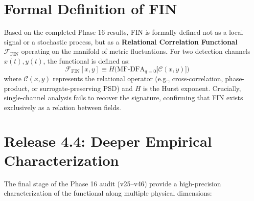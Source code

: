 \documentclass[11pt,a4paper]{book}
\theoremstyle{remark}
\begin{document}
\section{Formal Definition of FIN}
Based on the completed Phase 16 results, FIN is formally defined not as a local signal or a stochastic process, but as a \textbf{Relational Correlation Functional} $\mathcal{F}_{\text{FIN}}$ operating on the manifold of metric fluctuations. For two detection channels $x(t), y(t)$, the functional is defined as:
\begin{equation}
\boxed{\mathcal{F}_{\text{FIN}}[x,y] \equiv H\Big( \text{MF-DFA}_{q=0}\big[ \mathcal{C}(x,y) \big] \Big)}
\end{equation}
where $\mathcal{C}(x,y)$ represents the relational operator (e.g., cross-correlation, phase-product, or surrogate-preserving PSD) and $H$ is the Hurst exponent. Crucially, single-channel analysis fails to recover the signature, confirming that FIN exists exclusively as a relation between fields.

\section{Release 4.4: Deeper Empirical Characterization}

The final stage of the Phase 16 audit (v25--v46) provide a high-precision characterization of the functional along multiple physical dimensions:
\end{document}
